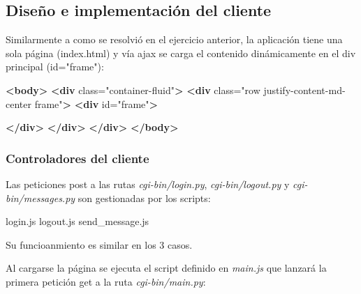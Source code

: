 \documentclass[12pt]{extarticle}
\newenvironment{Shaded}{}{}
\newcommand{\KeywordTok}[1]{\textcolor[rgb]{0.00,0.44,0.13}{\textbf{{#1}}}}
\newcommand{\StringTok}[1]{\textcolor[rgb]{0.25,0.44,0.63}{{#1}}}
\newcommand{\OtherTok}[1]{\textcolor[rgb]{0.00,0.44,0.13}{{#1}}}
\newcommand{\NormalTok}[1]{{#1}}
\newcommand{\VariableTok}[1]{\textcolor[rgb]{0.10,0.09,0.49}{{#1}}}
\newcommand{\AttributeTok}[1]{\textcolor[rgb]{0.49,0.56,0.16}{{#1}}}
\begin{document}
\subsection{Diseño e implementación del
cliente}\label{diseuxf1o-e-implementaciuxf3n-del-cliente-1}

Similarmente a como se resolvió en el ejercicio anterior, la aplicación
tiene una sola página (index.html) y vía ajax se carga el contenido
dinámicamente en el div principal (id="frame"):

\begin{Shaded}
\begin{Highlighting}[]
\KeywordTok{<body>}
  \KeywordTok{<div}\OtherTok{ class=}\StringTok{"container-fluid"}\KeywordTok{>}
    \KeywordTok{<div}\OtherTok{ class=}\StringTok{"row justify-content-md-center frame"}\KeywordTok{>}
      \KeywordTok{<div}\OtherTok{ id=}\StringTok{"frame"}\KeywordTok{>}
        
      \KeywordTok{</div>}
    \KeywordTok{</div>}
  \KeywordTok{</div>}
\KeywordTok{</body>}
\end{Highlighting}
\end{Shaded}

\subsubsection{Controladores del
cliente}\label{controladores-del-cliente-1}

Las peticiones post a las rutas \emph{cgi-bin/login.py},
\emph{cgi-bin/logout.py} y \emph{cgi-bin/messages.py} son gestionadas
por los scripts:

\begin{Shaded}
\begin{Highlighting}[]
\VariableTok{login}\NormalTok{.}\AttributeTok{js} 
\VariableTok{logout}\NormalTok{.}\AttributeTok{js}
\VariableTok{send_message}\NormalTok{.}\AttributeTok{js}
\end{Highlighting}
\end{Shaded}

Su funcioanmiento es similar en los 3 casos.

Al cargarse la página se ejecuta el script definido en \emph{main.js}
que lanzará la primera petición get a la ruta \emph{cgi-bin/main.py}:
\end{document}
